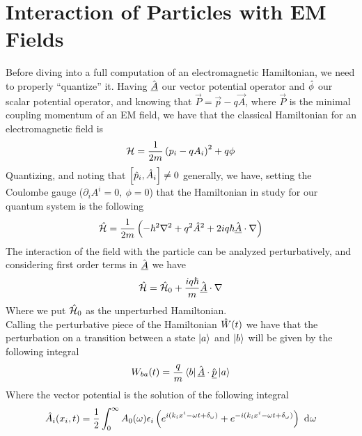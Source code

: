 \documentclass[../qm.tex]{subfiles}
\begin{document}
\section{Interaction of Particles with EM Fields}
	Before diving into a full computation of an electromagnetic Hamiltonian, we need to properly ``quantize'' it. Having $\hat{\underline{A}}$ our vector potential operator and $\hat{\phi}$ our scalar potential operator, and knowing that $\vec{P}=\vec{p}-q\vec{A}$, where $\vec{P}$ is the minimal coupling momentum of an EM field, we have that the classical Hamiltonian for an electromagnetic field is
	\begin{equation}
		\mathcal{H}=\frac{1}{2m}\left( p_i-qA_i \right)^2+q\phi
		\label{eq:classemham}
	\end{equation}
	Quantizing, and noting that $\comm{\opr{p}_i}{\opr{A}_i}\ne0$ generally, we have, setting the Coulombe gauge ($\partial_iA^i=0,\ \phi=0$) that the Hamiltonian in study for our quantum system is the following
	\begin{equation}
		\hat{\mathcal{H}}=\frac{1}{2m}\left( -\hbar^2\nabla^2+q^2\hat{A}^2+2iq\hbar\hat{\underline{A}}\cdot\nabla\right)
		\label{eq:qhamemfield}
	\end{equation}
	The interaction of the field with the particle can be analyzed perturbatively, and considering first order terms in $\hat{\underline{A}}$ we have
	\begin{equation}
		\hat{\mathcal{H}}=\hat{\mathcal{H}}_0+\frac{iq\hbar}{m}\hat{\underline{A}}\cdot\nabla
		\label{eq:weakfieldemham}
	\end{equation}
	Where we put $\hat{\mathcal{H}}_0$ as the unperturbed Hamiltonian.\\
	Calling the perturbative piece of the Hamiltonian $\hat{W}(t)$ we have that the perturbation on a transition between a state $\ket{a}$ and $\ket{b}$ will be given by the following integral
	\begin{equation}
		W_{ba}(t)=\frac{q}{m}\bra{b}\hat{\underline{A}}\cdot\hat{\underline{p}}\ket{a}
		\label{eq:empertmatrix}
	\end{equation}
	Where the vector potential is the solution of the following integral
	\begin{equation}
		\hat{A}_i(x_i,t)=\frac{1}{2}\int_{0}^{\infty}A_0(\omega)\epsilon_i\left( e^{i(k_ix^i-\omega t+\delta_{\omega})}+e^{-i(k_ix^i-\omega t +\delta_{\omega})} \right)\ \mathrm{d}^{}\omega
		\label{eq:vectorpotentialem}
	\end{equation}
\end{document}
